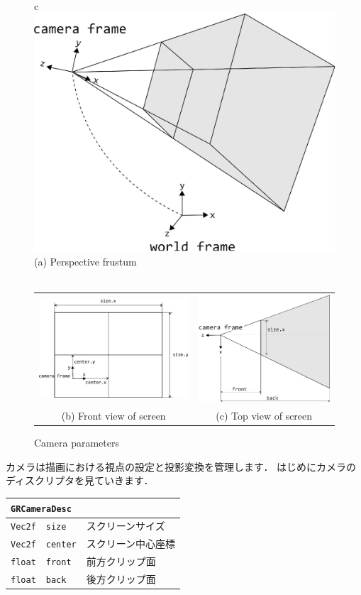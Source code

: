 \begin{figure}[t]
\begin{tabular}{c}
\includegraphics[width=.4\hsize]{fig/grcamera.eps} \\
(a) Perspective frustum \\
\\
\begin{tabular}{cc}
\includegraphics[width=.4\hsize]{fig/grcamera_front.eps} &
\includegraphics[width=.4\hsize]{fig/grcamera_top.eps} \\
(b) Front view of screen &
(c) Top view of screen
\end{tabular}
\end{tabular}
\caption{Camera parameters}
\label{fig_grcamera}
\end{figure}

\KLUDGE カメラは描画における視点の設定と投影変換を管理します．
\KLUDGE はじめにカメラのディスクリプタを見ていきます．

\begin{center}
\begin{tabular}{p{.15\hsize}p{.45\hsize}p{.3\hsize}}
\multicolumn{3}{l}{\texttt{GRCameraDesc}}					\\ \midrule
\texttt{Vec2f}	&	\texttt{size}	& スクリーンサイズ 		\\
\texttt{Vec2f}	&	\texttt{center}	& スクリーン中心座標 	\\
\texttt{float}	&	\texttt{front}	& 前方クリップ面		\\
\texttt{float}	&	\texttt{back}	& 後方クリップ面		\\
\end{tabular}
\end{center}

